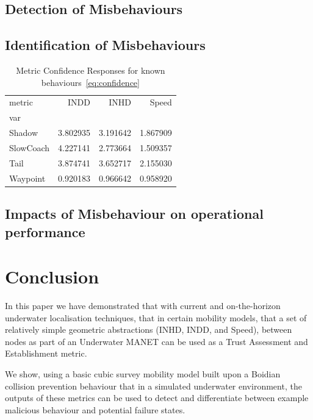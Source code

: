\documentclass[conference]{IEEEtran}
\begin{document}
\subsection{Detection of Misbehaviours}

\subsection{Identification of Misbehaviours}
\begin{table}[h]
  \caption{Metric Confidence Responses for known behaviours~\eqref{eq:confidence}}
  \centering
  \begin{tabular}{lrrr}
    \toprule
    metric &      INDD &      INHD &     Speed \\
    var       &           &           &           \\
    \midrule
    Shadow    &  3.802935 &  3.191642 &  1.867909 \\
    SlowCoach &  4.227141 &  2.773664 &  1.509357 \\
    Tail      &  3.874741 &  3.652717 &  2.155030 \\
    Waypoint  &  0.920183 &  0.966642 &  0.958920 \\
    \bottomrule
  \end{tabular}
\end{table}

\subsection{Impacts of Misbehaviour on operational performance}

\section{Conclusion}
In this paper we have demonstrated that with current and on-the-horizon underwater localisation techniques, that in certain mobility models, that a set of relatively simple geometric abstractions (INHD, INDD, and Speed), between nodes as part of an Underwater MANET can be used as a Trust Assessment and Establishment metric.

We show, using a basic cubic survey mobility model built upon a Boidian collision prevention behaviour that in a simulated underwater environment, the outputs of these metrics can be used to detect and differentiate between example malicious behaviour and potential failure states.
\end{document}
